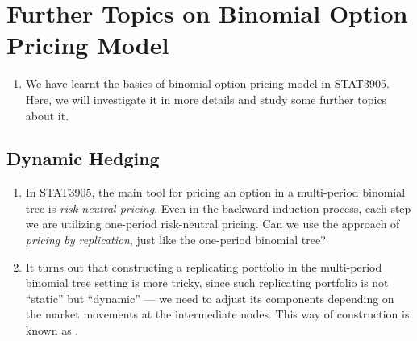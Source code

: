 \section{Further Topics on Binomial Option Pricing Model}
\label{sect:binom-model-further}
\begin{enumerate}
\item We have learnt the basics of binomial option pricing model in STAT3905.
Here, we will investigate it in more details and study some further topics
about it.
\end{enumerate}
\subsection{Dynamic Hedging}
\begin{enumerate}
\item In STAT3905, the main tool for pricing an option in a multi-period
binomial tree is \emph{risk-neutral pricing}. Even in the backward induction
process, each step we are utilizing one-period risk-neutral pricing. Can we use
the approach of \emph{pricing by replication}, just like the one-period
binomial tree?

\item It turns out that constructing a replicating portfolio in the
multi-period binomial tree setting is more tricky, since such replicating
portfolio is not ``static'' but ``dynamic'' --- we need to adjust its
components depending on the market movements at the intermediate nodes. This
way of construction is known as .

\begin{center}
\end{center}


\end{enumerate}
